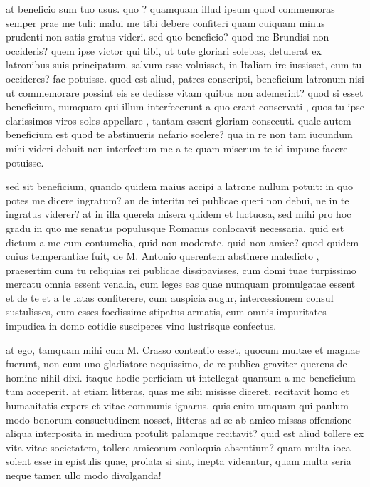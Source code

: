  at beneficio sum tuo usus. quo ? quamquam illud ipsum quod commemoras semper prae me tuli: malui me tibi debere confiteri quam cuiquam minus prudenti non satis gratus videri. sed quo beneficio? quod me Brundisi non occideris? quem ipse victor qui tibi, ut tute gloriari solebas, detulerat ex latronibus suis principatum, salvum esse voluisset, in Italiam ire iussisset, eum tu occideres? fac potuisse. quod est aliud, patres conscripti, beneficium latronum nisi ut commemorare possint eis se dedisse vitam quibus non ademerint? quod si esset beneficium, numquam qui illum interfecerunt a quo erant conservati , quos tu ipse clarissimos viros soles appellare , tantam essent gloriam consecuti. quale autem beneficium est quod te abstinueris nefario scelere? qua in re non tam iucundum mihi videri debuit non interfectum me a te quam miserum te id impune facere potuisse.

 sed sit beneficium, quando quidem maius accipi a latrone nullum potuit: in quo potes me dicere ingratum? an de interitu rei publicae queri non debui, ne in te ingratus viderer? at in illa querela misera quidem et luctuosa, sed mihi pro hoc gradu in quo me senatus populusque Romanus conlocavit necessaria, quid est dictum a me cum contumelia, quid non moderate, quid non amice? quod quidem cuius temperantiae fuit, de M. Antonio querentem abstinere maledicto , praesertim cum tu reliquias rei publicae dissipavisses, cum domi tuae turpissimo mercatu omnia essent venalia, cum leges eas quae numquam promulgatae essent et de te et a te latas confiterere, cum auspicia augur, intercessionem consul sustulisses, cum esses foedissime stipatus armatis, cum omnis impuritates impudica in domo cotidie susciperes vino lustrisque confectus.

 at ego, tamquam mihi cum M. Crasso contentio esset, quocum multae et magnae fuerunt, non cum uno gladiatore nequissimo, de re publica graviter querens de homine nihil dixi. itaque hodie perficiam ut intellegat quantum a me beneficium tum acceperit. at etiam litteras, quas me sibi misisse diceret, recitavit homo et humanitatis expers et vitae communis ignarus. quis enim umquam qui paulum modo bonorum consuetudinem nosset, litteras ad se ab amico missas offensione aliqua interposita in medium protulit palamque recitavit? quid est aliud tollere ex vita vitae societatem, tollere amicorum conloquia absentium? quam multa ioca solent esse in epistulis quae, prolata si sint, inepta videantur, quam multa seria neque tamen ullo modo divolganda!

